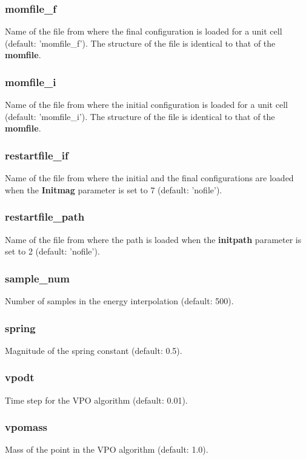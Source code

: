\documentclass{article}
\begin{document}
\subsubsection*{momfile\_f}
Name of the file from where the final configuration is loaded for a unit cell (default: 'momfile\_f'). The structure of the file is identical to that of the {\bf momfile}.

\subsubsection*{momfile\_i}
Name of the file from where the initial configuration is loaded for a unit cell (default: 'momfile\_i'). The structure of the file is identical to that of the {\bf momfile}.

\subsubsection*{restartfile\_if}
Name of the file from where the initial and the final configurations are loaded when the {\bf Initmag} parameter is set to 7 (default: 'nofile').

\subsubsection*{restartfile\_path}
Name of the file from where the path is loaded when the {\bf initpath} parameter is set to 2 (default: 'nofile').

\subsubsection*{sample\_num}
Number of samples in the energy interpolation (default: 500).

\subsubsection*{spring}
Magnitude of the spring constant (default: 0.5).

\subsubsection*{vpodt}
Time step for the VPO algorithm (default: 0.01).

\subsubsection*{vpomass}
Mass of the point in the VPO algorithm (default: 1.0).
\end{document}
